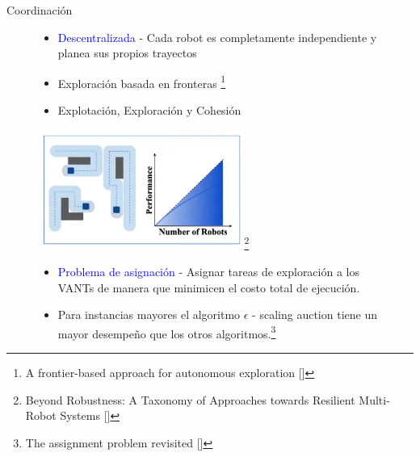 \documentclass[24pt,aspectratio=169]{beamer}
\begin{document}
\begin{frame}{Coordinación}
  \begin{figure}[ht!]
    \centering
    \begin{minipage}{0.48\textwidth}
      {\scriptsize
      \begin{itemize}
      \item \textcolor{blue}{Descentralizada} - Cada robot es completamente independiente y planea sus propios trayectos
      \item Exploración basada en fronteras {\footnote{\tiny{A frontier-based approach for autonomous exploration [\cite{613851}]}}}
      \item Explotación, Exploración y Cohesión
      \end{itemize}
      }
    \end{minipage}\hfill
    \begin{minipage}{0.48\textwidth}
      \centering
      \includegraphics[width=0.6\textwidth]{coordination}{\footnote{\tiny{Beyond Robustness: A Taxonomy of Approaches towards Resilient Multi-Robot Systems [\cite{amanda}]}}}
    \end{minipage}
    \vspace{-0.2cm} %
    \begin{minipage}{0.48\textwidth}
      {\scriptsize
      \begin{itemize}
      \item \textcolor{blue}{Problema de asignación} - Asignar tareas de exploración a los VANTs de manera que minimicen el costo total de ejecución.
      \item Para instancias mayores el algoritmo $\epsilon$ - scaling auction tiene un mayor desempeño que los otros algoritmos.{\footnote{\tiny{The assignment problem revisited [\cite{Alfaro2021}]}}}
      \end{itemize}
      }
    \end{minipage}\hfill
    \begin{minipage}{0.48\textwidth}

\end{minipage}
\end{figure}
\end{frame}
\end{document}
